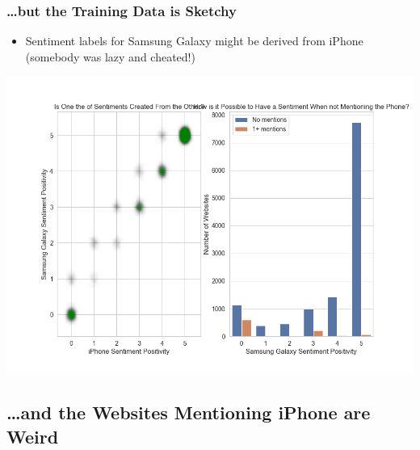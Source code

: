 \documentclass[10pt]{beamer}
\begin{document}
\begin{frame}
\frametitle{\ldots but the Training Data is Sketchy}

\begin{itemize}
    \item Sentiment labels for Samsung Galaxy might be derived from iPhone (somebody was lazy and cheated!)
\end{itemize}

{
    \centering
    \includegraphics[width=\textwidth,height=\textheight,keepaspectratio]{training_data_problems.png}
    \par
}

\end{frame}

\subsection{\ldots and the Websites Mentioning iPhone are Weird}
\end{document}
